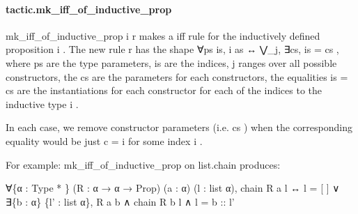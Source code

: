 \documentclass{article}
\begin{document}
\paragraph{tactic.mk\_iff\_of\_inductive\_prop}
\par
\colorbox[RGB]{253,246,227}{{{{\color[RGB]{101, 123, 131} mk\_iff\_of\_inductive\_prop i r }}}} makes a iff rule for the inductively defined proposition 
\colorbox[RGB]{253,246,227}{{{{\color[RGB]{101, 123, 131} i }}}}.
The new rule 
\colorbox[RGB]{253,246,227}{{{{\color[RGB]{101, 123, 131} r }}}} has the shape 
\colorbox[RGB]{253,246,227}{{{{\color[RGB]{101, 123, 131} ∀ps is, i  }}}{{{\color[RGB]{133, 153, 0} as }}}{{{\color[RGB]{101, 123, 131}   }}}{{{\color[RGB]{181, 137, 0} ↔ }}}{{{\color[RGB]{101, 123, 131}  ⋁\_j, ∃cs, is  }}}{{{\color[RGB]{181, 137, 0} = }}}{{{\color[RGB]{101, 123, 131}  cs }}}}, where 
\colorbox[RGB]{253,246,227}{{{{\color[RGB]{101, 123, 131} ps }}}} are the type
parameters, 
\colorbox[RGB]{253,246,227}{{{{\color[RGB]{101, 123, 131} is }}}} are the indices, 
\colorbox[RGB]{253,246,227}{{{{\color[RGB]{101, 123, 131} j }}}} ranges over all possible constructors, the 
\colorbox[RGB]{253,246,227}{{{{\color[RGB]{101, 123, 131} cs }}}} are the
parameters for each constructors, the equalities 
\colorbox[RGB]{253,246,227}{{{{\color[RGB]{101, 123, 131} is  }}}{{{\color[RGB]{181, 137, 0} = }}}{{{\color[RGB]{101, 123, 131}  cs }}}} are the instantiations for each
constructor for each of the indices to the inductive type 
\colorbox[RGB]{253,246,227}{{{{\color[RGB]{101, 123, 131} i }}}}.
\par
In each case, we remove constructor parameters (i.e. 
\colorbox[RGB]{253,246,227}{{{{\color[RGB]{101, 123, 131} cs }}}}) when the corresponding equality would
be just 
\colorbox[RGB]{253,246,227}{{{{\color[RGB]{101, 123, 131} c  }}}{{{\color[RGB]{181, 137, 0} = }}}{{{\color[RGB]{101, 123, 131}  i }}}} for some index 
\colorbox[RGB]{253,246,227}{{{{\color[RGB]{101, 123, 131} i }}}}.
\par
For example: 
\colorbox[RGB]{253,246,227}{{{{\color[RGB]{101, 123, 131} mk\_iff\_of\_inductive\_prop }}}} on 
\colorbox[RGB]{253,246,227}{{{{\color[RGB]{101, 123, 131} list.chain }}}} produces:
\par
∀\{α : Type
*
\} (R : α → α → Prop) (a : α) (l : list α),
chain R a l ↔ l = 
{[}
{]}
 ∨ ∃\{b : α\} \{l' : list α\}, R a b ∧ chain R b l ∧ l = b :: l'
\end{document}
